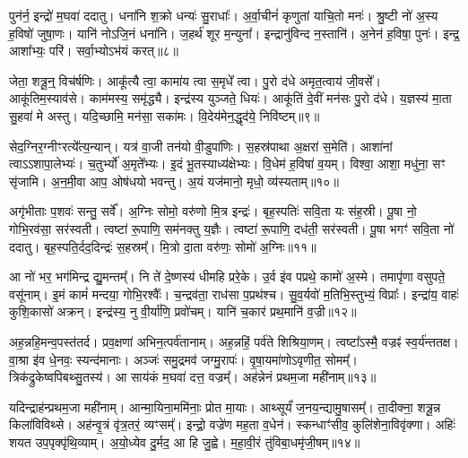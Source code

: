 पुन॑र्न॒ इन्द्रो॑ म॒घवा॑ ददातु।
धना॑नि श॒क्रो धन्यः॑ सु॒राधाः᳚।
अ॒र्वा॒चीनं॑ कृणुतां याचि॒तो मनः॑।
श्रु॒ष्टी नो॑ अ॒स्य ह॒विषो॑ जुषा॒णः।
यानि॑ नोऽजि॒नं धना॑नि।
ज॒हर्थ॑ शूर म॒न्युना᳚।
इन्द्रानु॑विन्द न॒स्तानि॑।
अ॒नेन॑ ह॒विषा॒ पुनः॑।
इन्द्र॒ आशा᳚भ्यः॒ परि॑।
सर्वा॒भ्यो\-ऽभ॑यं करत्॥८॥\ip

जेता॒ शत्रू॒न्॒ विच॑र्\mbox{}षणिः।
आकू᳚त्यै त्वा॒ कामा॑य त्वा स॒मृधे᳚ त्वा।
पु॒रो द॑धे अमृत॒त्वाय॑ जी॒वसे᳚।
आकू॑तिम॒स्याव॑से।
काम॑मस्य॒ समृ॑द्ध्यै।
इन्द्र॑स्य युञ्जते॒ धियः॑।
आकू॑तिं दे॒वीं मन॑सः पु॒रो द॑धे।
य॒ज्ञस्य॑ मा॒ता सु॒हवा॑ मे अस्तु।
यदि॒च्छामि॒ मन॑सा॒ सका॑मः।
वि॒देय॑मेन॒द्धृद॑ये॒ निवि॑ष्टम्॥९॥\ip

सेद॒ग्निर॒ग्नीꣳरत्ये᳚त्य॒न्यान्।
यत्र॑ वा॒जी तन॑यो वी॒डुपा॑णिः।
स॒हस्र॑पाथा अ॒क्षरा॑ स॒मेति॑।
आशा॑नां त्वा\-ऽऽशापा॒लेभ्यः॑।
च॒तुर्भ्यो॑ अ॒मृते᳚भ्यः।
इ॒दं भू॒तस्याध्य॑क्षेभ्यः।
वि॒धेम॑ ह॒विषा॑ व॒यम्।
विश्वा॒ आशा॒ मधु॑ना॒ सꣳ सृ॑जामि।
अ॒न॒मी॒वा आप॒ ओष॑धयो भवन्तु।
अ॒यं यज॑मानो॒ मृधो॒ व्य॑स्यताम्॥१०॥\ip

अगृ॑भीताः प॒शवः॑ सन्तु॒ सर्वे᳚।
अ॒ग्निः सोमो॒ वरु॑णो मि॒त्र इन्द्रः॑।
बृह॒स्पतिः॑ सवि॒ता यः स॑ह॒स्री।
पू॒षा नो॒ गोभि॒रव॑सा॒ सर॑स्वती।
त्वष्टा॑ रू॒पाणि॒ सम॑नक्तु य॒ज्ञैः।
त्वष्टा॑ रू॒पाणि॒ दध॑ती॒ सर॑स्वती।
पू॒षा भगꣳ॑ सवि॒ता नो॑ ददातु।
बृह॒स्पति॒र्दद॒दिन्द्रः॑ स॒हस्रम्᳚।
मि॒त्रो दा॒ता वरु॑णः॒ सोमो॑ अ॒ग्निः॥११॥\ip\anuvakamend[क॒र॒न्निवि॑ष्टमस्यता॒न्नव॑ च]

आ नो॑ भर॒ भग॑मिन्द्र द्यु॒मन्तम्᳚।
नि ते॑ दे॒ष्णस्य॑ धीमहि प्ररे॒के।
उ॒र्व इ॑व पप्रथे॒ कामो॑ अ॒स्मे।
तमापृ॑णा वसुपते॒ वसू॑नाम्।
इ॒मं कामं॑ मन्दया॒ गोभि॒रश्वैः᳚।
च॒न्द्रव॑ता॒ राध॑सा प॒प्रथ॑श्च।
सु॒व॒र्यवो॑ म॒तिभि॒स्तुभ्यं॒ विप्राः᳚।
इन्द्रा॑य॒ वाहः॑ कुशि॒कासो॑ अक्रन्।
इन्द्र॑स्य॒ नु वी॒र्या॑णि॒ प्रवो॑चम्।
यानि॑ च॒कार॑ प्रथ॒मानि॑ व॒ज्री॥१२॥\ip

अह॒न्नहि॒मन्व॒पस्त॑तर्द।
प्रव॒क्षणा॑ अभिन॒त्पर्व॑तानाम्।
अह॒न्नहिं॒ पर्व॑ते शिश्रिया॒णम्।
त्वष्टा᳚\-ऽस्मै॒ वज्रꣴ॑ स्व॒र्य॑न्ततक्ष।
वा॒श्रा इ॑व धे॒नवः॒ स्यन्द॑मानाः।
अञ्जः॑ समु॒द्रमव॑ जग्मु॒रापः॑।
वृ॒षा॒यमा॑णो\-ऽवृणीत॒ सोमम्᳚।
त्रिक॑द्रुकेष्वपिबथ्सु॒तस्य॑।
आ साय॑कं म॒घवा॑ दत्त॒ वज्रम्᳚।
अह॑न्नेनं प्रथम॒जा मही॑नाम्॥१३॥\ip

यदिन्द्राह॑न्प्रथम॒जा मही॑नाम्।
आन्मा॒यिना॒ममि॑नाः॒ प्रोत मा॒याः।
आथ्सूर्यं॑ ज॒नय॒न्द्यामु॒षासम्᳚।
ता॒दीक्ना॒ शत्रू॒न्न किला॑विविथ्से।
अह॑न्वृ॒त्रं वृ॑त्र॒तरं॒ व्यꣳसम्᳚।
इन्द्रो॒ वज्रे॑ण मह॒ता व॒धेन॑।
स्कन्धाꣳ॑सीव॒ कुलि॑शेना॒विवृ॑क्णा।
अहिः॑ शयत उप॒पृक्पृ॑थि॒व्याम्।
अ॒यो॒ध्येव दु॒र्मद॒ आ हि जु॒ह्वे।
म॒हा॒वी॒रं तु॑विबा॒धमृ॑जी॒षम्॥१४॥\ip

